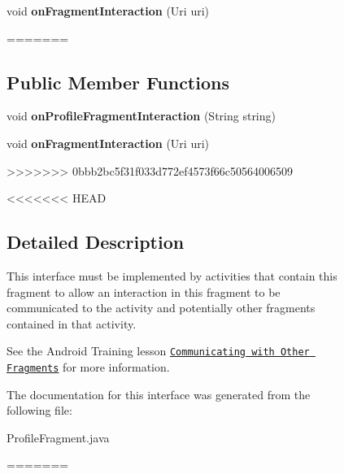 \begin{figure}[H]
\begin{DoxyCompactItemize}
\item 
\hypertarget{interfacecom_1_1example_1_1sel_1_1lostfound_1_1ProfileFragment_1_1OnFragmentInteractionListener_acde287647e7b1caa72e45c54814c5e3f}{void {\bfseries on\-Fragment\-Interaction} (Uri uri)}\label{interfacecom_1_1example_1_1sel_1_1lostfound_1_1ProfileFragment_1_1OnFragmentInteractionListener_acde287647e7b1caa72e45c54814c5e3f}
=======
\subsection*{\-Public \-Member \-Functions}
\begin{DoxyCompactItemize}
\item 
\hypertarget{interfacecom_1_1example_1_1sel_1_1lostfound_1_1ProfileFragment_1_1OnFragmentInteractionListener_af75f735b544a4f6c22f58e2f0ea5c671}{void {\bfseries on\-Profile\-Fragment\-Interaction} (\-String string)}\label{interfacecom_1_1example_1_1sel_1_1lostfound_1_1ProfileFragment_1_1OnFragmentInteractionListener_af75f735b544a4f6c22f58e2f0ea5c671}

\item 
\hypertarget{interfacecom_1_1example_1_1sel_1_1lostfound_1_1ProfileFragment_1_1OnFragmentInteractionListener_acde287647e7b1caa72e45c54814c5e3f}{void {\bfseries on\-Fragment\-Interaction} (\-Uri uri)}\label{interfacecom_1_1example_1_1sel_1_1lostfound_1_1ProfileFragment_1_1OnFragmentInteractionListener_acde287647e7b1caa72e45c54814c5e3f}
>>>>>>> 0bbb2bc5f31f033d772ef4573f66c50564006509

\end{DoxyCompactItemize}


<<<<<<< HEAD
\subsection{Detailed Description}
This interface must be implemented by activities that contain this fragment to allow an interaction in this fragment to be communicated to the activity and potentially other fragments contained in that activity. 

See the Android Training lesson \href{http://developer.android.com/training/basics/fragments/communicating.html}{\tt Communicating with Other Fragments} for more information. 

The documentation for this interface was generated from the following file\-:\begin{DoxyCompactItemize}
\item 
Profile\-Fragment.\-java\end{DoxyCompactItemize}
=======

\end{DoxyCompactItemize}
\end{figure}
